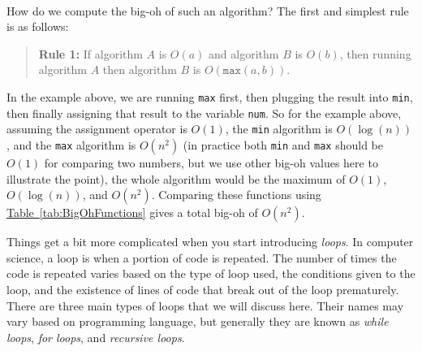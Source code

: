\documentclass[11pt,oneside]{book}
\theoremstyle{definition}
\begin{document}
\

How do we compute the big-oh of such an algorithm?
The first and simplest rule is as follows:
\begin{quote}
    \textbf{Rule 1:} If algorithm $A$ is $O(a)$ and algorithm $B$ is $O(b)$, then running algorithm $A$ then algorithm $B$ is $O(\texttt{max}(a, b))$. \label{quote:Rule1}
\end{quote}
In the example above, we are running \texttt{max} first, then plugging the result into \texttt{min}, then finally assigning that result to the variable \texttt{num}.
So for the example above, assuming the assignment operator is $O(1)$, the \texttt{min} algorithm is $O(\log(n))$, and the \texttt{max} algorithm is $O(n^{2})$ (in practice both \texttt{min} and \texttt{max} should be $O(1)$ for comparing two numbers, but we use other big-oh values here to illustrate the point), the whole algorithm would be the maximum of $O(1)$, $O(\log(n))$, and $O(n^{2})$.
Comparing these functions using \hyperref[tab:BigOhFunctions]{Table~\ref*{tab:BigOhFunctions}} gives a total big-oh of $O(n^{2})$.

Things get a bit more complicated when you start introducing \emph{loops}.
In computer science, a loop is when a portion of code is repeated.
The number of times the code is repeated varies based on the type of loop used, the conditions given to the loop, and the existence of lines of code that break out of the loop prematurely.
There are three main types of loops that we will discuss here.
Their names may vary based on programming language, but generally they are known as \emph{while loops}, \emph{for loops}, and \emph{recursive loops}.
\end{document}
